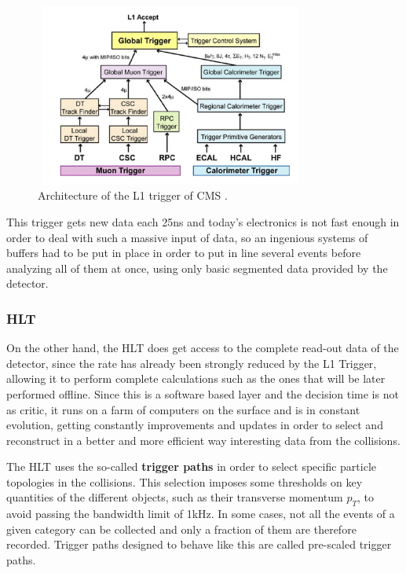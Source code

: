 \documentclass[a4paper, 10pt, openright]{report}
\begin{document}
\begin{figure}[htbp]
\begin{center}
\includegraphics[width=9cm, height=6cm]{figs/L1Trigg.png}
\caption{Architecture of the \ac{L1} trigger of \ac{CMS} \cite{CMSDescription}.}
\label{fig:L1Trigg}
\end{center}
\end{figure}

This trigger gets new data each 25ns and today's electronics is not fast enough in order to deal with such a massive input of data, so an ingenious systems of buffers had to be put in place in order to put in line several events before analyzing all of them at once, using only basic segmented data provided by the detector.

\subsubsection*{\acf{HLT}}

On the other hand, the \ac{HLT} \cite{HLT} does get access to the complete read-out data of the detector, since the rate has already been strongly reduced by the \ac{L1} Trigger, allowing it to perform complete calculations such as the ones that will be later performed offline. Since this is a software based layer and the decision time is not as critic, it runs on a farm of computers on the surface and is in constant evolution, getting constantly improvements and updates in order to select and reconstruct in a better and more efficient way interesting data from the collisions.

The \ac{HLT} uses the so-called \textbf{trigger paths} in order to select specific particle topologies in the collisions. This selection imposes some thresholds on key quantities of the different objects, such as their transverse momentum $p_T$, to avoid passing the bandwidth limit of 1kHz. In some cases, not all the events of a given category can be collected and only a fraction of them are therefore recorded. Trigger paths designed to behave like this are called pre-scaled trigger paths.
\end{document}
